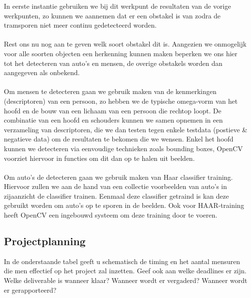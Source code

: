 \documentclass[a4paper,oneside,11pt,final]{memoir}
\begin{document}
In eerste instantie gebruiken we bij dit werkpunt de resultaten van de vorige werkpunten, zo kunnen we aannemen dat er een obstakel is van zodra de tramsporen niet meer continu gedetecteerd worden.
\\\\
Rest ons nu nog aan te geven welk soort obstakel dit is. Aangezien we onmogelijk voor alle soorten objecten een herkenning kunnen maken beperken we ons hier tot het detecteren van auto's en mensen, de overige obstakels worden dan aangegeven als onbekend.
\\\\
Om mensen te detecteren gaan we gebruik maken van de kenmerkingen (descriptoren) van een persoon, zo hebben we de typische omega-vorm van het hoofd en de  bouw van een lichaam van een persoon die rechtop loopt. De combinatie van een hoofd en schouders kunnen we samen opnemen in een verzameling van descriptoren, die we dan testen tegen enkele testdata (postieve \& negatieve data) om de resultaten te bekomen die we wensen. Enkel het hoofd kunnen we detecteren via eenvoudige technieken zoals bounding boxes, OpenCV voorziet hiervoor in functies om dit dan op te halen uit beelden.
\\\\
Om auto's de detecteren gaan we gebruik maken van Haar classifier training. Hiervoor zullen we aan de hand van een collectie voorbeelden van auto's in zijaanzicht de classifier trainen. Eenmaal deze classifier getraind is kan deze gebruikt worden om auto's op te sporen in de beelden. Ook voor HAAR-training heeft OpenCV een ingebouwd systeem om deze training door te voeren.

\subsection{Projectplanning}\label{sec:Projectplanning}

In de onderstaande tabel geeft u schematisch de timing en het aantal mensuren die men effectief op het project zal inzetten. Geef ook aan welke deadlines er zijn. Welke deliverable is wanneer klaar? Wanneer wordt er vergaderd? Wanneer wordt er gerapporteerd?
\end{document}
